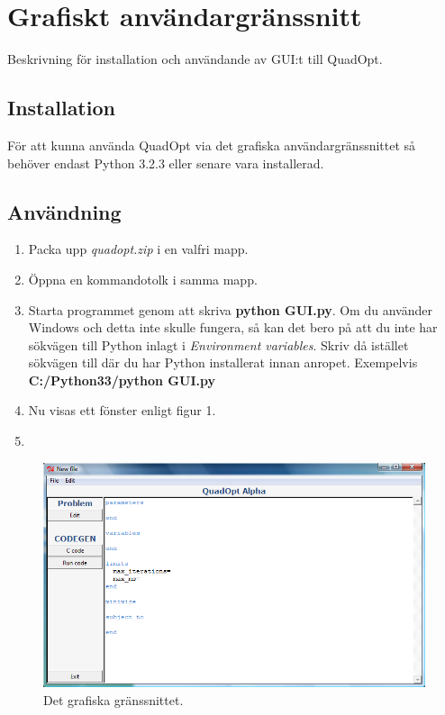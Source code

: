 \section{Grafiskt användargränssnitt}
Beskrivning för installation och användande av GUI:t till QuadOpt.

\subsection{Installation}
För att kunna använda QuadOpt via det grafiska användargränssnittet så behöver endast Python 3.2.3 eller senare vara installerad.

\subsection{Användning}
\begin{enumerate}
	\item Packa upp \emph{quadopt.zip} i en valfri mapp.
	\item Öppna en kommandotolk i samma mapp.
	\item Starta programmet genom att skriva \textbf{python GUI.py}. Om du använder Windows och detta inte skulle fungera, så kan det bero på att du inte har sökvägen till Python inlagt i \emph{Environment variables}. Skriv då istället sökvägen till där du har Python installerat innan anropet. Exempelvis \textbf{C:/Python33/python GUI.py}
	\item Nu visas ett fönster enligt figur 1. 
	\item 
\end{enumerate}

\begin{figure}[h]
\includegraphics[scale=0.52]{bilder/gui.png}
\caption{Det grafiska gränssnittet.}
\end{figure}